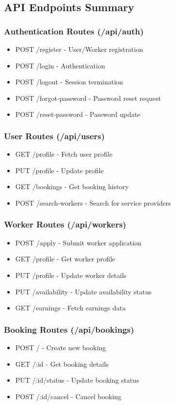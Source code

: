 \documentclass[12pt,a4paper]{article}
\begin{document}
\subsection*{API Endpoints Summary}

\subsubsection*{Authentication Routes (/api/auth)}
\begin{itemize}[leftmargin=*]
    \item POST /register - User/Worker registration
    \item POST /login - Authentication
    \item POST /logout - Session termination
    \item POST /forgot-password - Password reset request
    \item POST /reset-password - Password update
\end{itemize}

\subsubsection*{User Routes (/api/users)}
\begin{itemize}[leftmargin=*]
    \item GET /profile - Fetch user profile
    \item PUT /profile - Update profile
    \item GET /bookings - Get booking history
    \item POST /search-workers - Search for service providers
\end{itemize}

\subsubsection*{Worker Routes (/api/workers)}
\begin{itemize}[leftmargin=*]
    \item POST /apply - Submit worker application
    \item GET /profile - Get worker profile
    \item PUT /profile - Update worker details
    \item PUT /availability - Update availability status
    \item GET /earnings - Fetch earnings data
\end{itemize}

\subsubsection*{Booking Routes (/api/bookings)}
\begin{itemize}[leftmargin=*]
    \item POST / - Create new booking
    \item GET /:id - Get booking details
    \item PUT /:id/status - Update booking status
    \item POST /:id/cancel - Cancel booking
\end{itemize}
\end{document}
